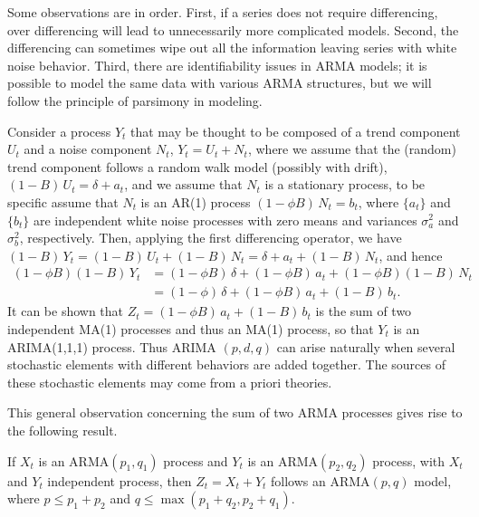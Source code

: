 Some observations are in order. First, if a series does not require differencing, over differencing will lead to unnecessarily more complicated models. Second, the differencing can sometimes wipe out all the information leaving series with white noise behavior. Third, there are identifiability issues in ARMA models; it is possible to model the same data with various ARMA structures, but we will follow the principle of parsimony in modeling. 


\begin{ex}
Consider a process $Y_t$ that may be thought to be composed of a trend component $U_t$ and a noise component $N_t$, $Y_t = U_t + N_t$, where we assume that the (random) trend component follows a random walk model (possibly with drift), $(1 - B)\, U_t = \delta + a_t$, and we assume that $N_t$ is a stationary process, to be specific assume that $N_t$ is an AR(1) process $(1 - \phi B)\, N_t = b_t$, where $\{ a_t \}$ and $\{ b_t \}$ are independent white noise processes with zero means and variances $\sigma_a^2$ and $\sigma_b^2$, respectively. Then, applying the first differencing operator, we have $(1 - B)\, Y_t = (1 - B)\, U_t + (1 - B)\, N_t = \delta + a_t + (1 - B)\, N_t$, and hence
	\begin{equation} \label{eqn:bphi}
	\begin{split}
	(1 - \phi B)(1 - B)\,Y_t&= (1 - \phi B)\, \delta + (1 - \phi B)\, a_t + (1 - \phi B)(1 - B)\, N_t \\
	&= (1 - \phi)\, \delta + (1 - \phi B)\, a_t + (1 - B)\, b_t.
	\end{split}
	\end{equation}
It can be shown that $Z_t = (1 - \phi B)\, a_t + (1 - B)\, b_t$ is the sum of two independent MA(1) processes and thus an MA(1) process, so that $Y_t$ is an ARIMA(1,1,1) process. Thus ARIMA $(p, d, q)$ can arise naturally when several stochastic elements with different behaviors are added together. The sources of these stochastic elements may come from a priori theories. \xqed
\end{ex}


This general observation concerning the sum of two ARMA processes gives rise to the following result. 


\begin{result}[Aggregation] \label{thm:agg}
If $X_t$ is an ARMA$(p_1,q_1)$ process and $Y_t$ is an ARMA$(p_2, q_2)$ process, with $X_t$ and $Y_t$ independent process, then $Z_t = X_t + Y_t$ follows an ARMA$(p,q)$ model, where $p \leq p_1 + p_2$ and $q \leq \max(p_1 + q_2, p_2 + q_1)$.
\end{result}



